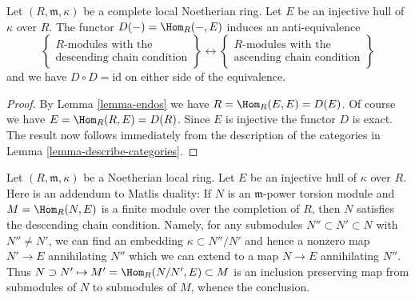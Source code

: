 \begin{proposition}
\label{proposition-matlis}
Let $(R, \mathfrak m, \kappa)$ be a complete local Noetherian ring.
Let $E$ be an injective hull of $\kappa$ over $R$. The functor
$D(-) = \Hom_R(-, E)$ induces an anti-equivalence
$$
\left\{
\begin{matrix}
R\text{-modules with the} \\
\text{descending chain condition}
\end{matrix}
\right\}
\longleftrightarrow
\left\{
\begin{matrix}
R\text{-modules with the} \\
\text{ascending chain condition}
\end{matrix}
\right\}
$$
and we have $D \circ D = \text{id}$ on either side of the equivalence.
\end{proposition}

\begin{proof}
By Lemma \ref{lemma-endos} we have $R = \Hom_R(E, E) = D(E)$.
Of course we have $E = \Hom_R(R, E) = D(R)$. Since $E$ is injective
the functor $D$ is exact. The result now follows immediately from the
description of the categories in
Lemma \ref{lemma-describe-categories}.
\end{proof}

\begin{remark}
\label{remark-matlis}
Let $(R, \mathfrak m, \kappa)$ be a Noetherian local ring.
Let $E$ be an injective hull of $\kappa$ over $R$. Here is an
addendum to Matlis duality: If $N$ is an $\mathfrak m$-power torsion module
and $M = \Hom_R(N, E)$ is a finite module over the completion of $R$,
then $N$ satisfies the descending chain condition. Namely, for any
submodules $N'' \subset N' \subset N$ with $N'' \not = N'$, we can
find an embedding $\kappa \subset N''/N'$ and hence a nonzero
map $N' \to E$ annihilating $N''$ which we can extend to a map $N \to E$
annihilating $N''$. Thus $N \supset N' \mapsto M' = \Hom_R(N/N', E) \subset M$
is an inclusion preserving map from submodules of $N$ to submodules
of $M$, whence the conclusion.
\end{remark}




















